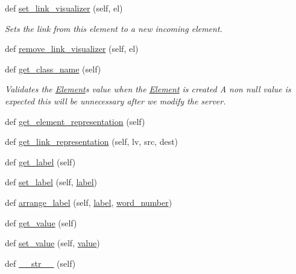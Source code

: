 \begin{DoxyCompactItemize}
def \hyperlink{class_element_1_1_element_a271105afaca65219ec996c5c11daf2fb}{set\+\_\+link\+\_\+visualizer} (self, el)
\begin{DoxyCompactList}\small\item\em Sets the link from this element to a new incoming element. \end{DoxyCompactList}\item 
def \hyperlink{class_element_1_1_element_a5b95abcbe7c8f234718af1053ff3a6a5}{remove\+\_\+link\+\_\+visualizer} (self, el)
\item 
def \hyperlink{class_element_1_1_element_ad29b8d75856928720f2591a9d01753b9}{get\+\_\+class\+\_\+name} (self)
\begin{DoxyCompactList}\small\item\em Validates the \hyperlink{class_element_1_1_element}{Element}\textquotesingle{}s value when the \hyperlink{class_element_1_1_element}{Element} is created A non null value is expected this will be unnecessary after we modify the server. \end{DoxyCompactList}\item 
def \hyperlink{class_element_1_1_element_a8ee6c77293e9483ada6d5d3efac9fca5}{get\+\_\+element\+\_\+representation} (self)
\item 
def \hyperlink{class_element_1_1_element_a2a95fa3c045e50e3272f988255a9ddf6}{get\+\_\+link\+\_\+representation} (self, lv, src, dest)
\item 
def \hyperlink{class_element_1_1_element_a737749ca9cb91970b2663d30accea6bd}{get\+\_\+label} (self)
\item 
def \hyperlink{class_element_1_1_element_a98064e3a8d66c6e9e007a8f451d9a042}{set\+\_\+label} (self, \hyperlink{class_element_1_1_element_ae566aaad38a02f4c45361f0597b71332}{label})
\item 
def \hyperlink{class_element_1_1_element_a9fd60525ebf3cf5e3767f4b631a1cba5}{arrange\+\_\+label} (self, \hyperlink{class_element_1_1_element_ae566aaad38a02f4c45361f0597b71332}{label}, \hyperlink{class_element_1_1_element_a5e69f0ed0d43817e2546dd8bb3b467e0}{word\+\_\+number})
\item 
def \hyperlink{class_element_1_1_element_aa1381b16d7f9c74bb0a157d9efc0edeb}{get\+\_\+value} (self)
\item 
def \hyperlink{class_element_1_1_element_a966043893a38b242280493ea3f196e55}{set\+\_\+value} (self, \hyperlink{class_element_1_1_element_ace1443ff574a2d07ced07f88d11ba5c8}{value})
\item 
def \hyperlink{class_element_1_1_element_a2ffb262087576d15a2e93b864d4ce13a}{\+\_\+\+\_\+str\+\_\+\+\_\+} (self)
\end{DoxyCompactItemize}
